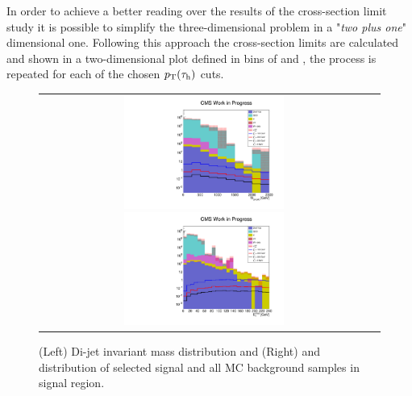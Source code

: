 In order to achieve a better reading over the results of the cross-section limit study it is possible to simplify the three-dimensional problem in a "\textit{two plus one}" dimensional one. Following this approach the cross-section limits are calculated and shown in a two-dimensional plot defined in bins of \mjj and \met, the process is repeated for each of the chosen $p_{\text{T}}(\tau_{\text{h}})$ cuts.

\begin{figure}[tbh!]
	\centering
	\begin{tabular}{cc}
		\includegraphics[width=0.5\textwidth]{analysis/pics/h_dijetinvariantmass_Taui2TightIso.pdf}
		\includegraphics[width=0.5\textwidth]{analysis/pics/h_met_Taui2TightIso.pdf} 		
	\end{tabular}
	\caption{(Left) Di-jet invariant mass distribution and (Right) and \met distribution of selected signal and all MC background samples in signal region.}
	\label{fig::crplots1_Taui2TightIso_13tev_results}
\end{figure}

